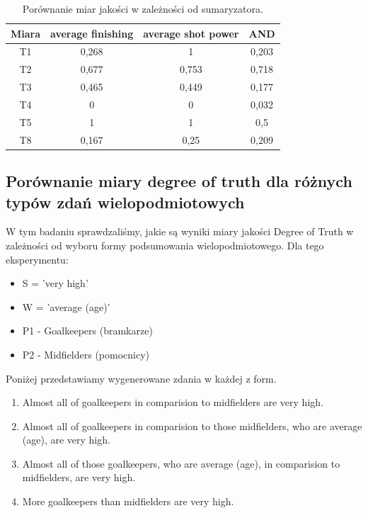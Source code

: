 \documentclass{classrep}
\begin{document}
	\begin{table}[h!]
		\centering
		\begin{tabular} {c c c c}
			\hline
			\textbf{Miara} & \textbf{average finishing} & \textbf{average shot power} & \textbf{AND} \\ [0.5ex] 
			\hline	
			\hline 
			T1 & 0,268 &	1     & 0,203 \\
			T2 & 0,677 &	0,753 & 0,718 \\
			T3 & 0,465 &    0,449 & 0,177 \\
			T4 & 0     &	0	  & 0,032 \\
			T5 & 1     &	1     & 0,5   \\
			T8 & 0,167 &	0,25  & 0,209 \\
					
			\hline			
		\end{tabular}
		\caption{Porównanie miar jakości w zależności od sumaryzatora. }
		\label{tabelaex3a}
	\end{table}

	\newpage
	\subsection{Porównanie miary degree of truth dla różnych typów zdań wielopodmiotowych}
	
	W tym badaniu sprawdzaliśmy, jakie są wyniki miary jakości Degree of Truth w zależności od wyboru formy podsumowania wielopodmiotowego.
	Dla tego eksperymentu:
	\begin{itemize}
		\item S = 'very high'
		\item W = 'average (age)'
		\item P1 - Goalkeepers (bramkarze)
		\item P2 - Midfielders (pomocnicy)
	\end{itemize}
	Poniżej przedstawiamy wygenerowane zdania w każdej z form.
	\begin{enumerate}
		\item Almost all of goalkeepers in comparision to midfielders are very high.
		\item Almost all of goalkeepers in comparision to those midfielders, who are average (age), are very high.
		\item Almost all of those goalkeepers, who are average (age), in comparision to midfielders, are very high.
		\item More goalkeepers than midfielders are very high.
	\end{enumerate}
	
\end{document}
